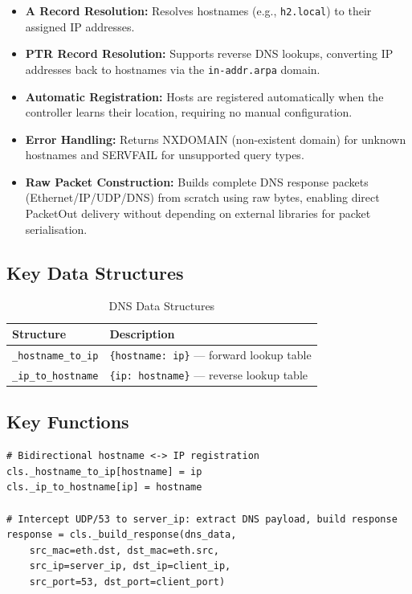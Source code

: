 \documentclass[12pt,a4paper]{article}
\begin{document}
\begin{itemize}[leftmargin=1.5cm]
    \item \textbf{A Record Resolution:} Resolves hostnames (e.g., \texttt{h2.local}) to their assigned IP addresses.
    \item \textbf{PTR Record Resolution:} Supports reverse DNS lookups, converting IP addresses back to hostnames via the \texttt{in-addr.arpa} domain.
    \item \textbf{Automatic Registration:} Hosts are registered automatically when the controller learns their location, requiring no manual configuration.
    \item \textbf{Error Handling:} Returns NXDOMAIN (non-existent domain) for unknown hostnames and SERVFAIL for unsupported query types.
    \item \textbf{Raw Packet Construction:} Builds complete DNS response packets (Ethernet/IP/UDP/DNS) from scratch using raw bytes, enabling direct PacketOut delivery without depending on external libraries for packet serialisation.
\end{itemize}

\subsection{Key Data Structures}

\begin{table}[H]
\centering
\begin{tabular}{@{}lp{8cm}@{}}
\toprule
\textbf{Structure} & \textbf{Description} \\
\midrule
\texttt{\_hostname\_to\_ip} & \texttt{\{hostname: ip\}} --- forward lookup table \\
\texttt{\_ip\_to\_hostname} & \texttt{\{ip: hostname\}} --- reverse lookup table \\
\bottomrule
\end{tabular}
\caption{DNS Data Structures}
\end{table}

\subsection{Key Functions}

\begin{lstlisting}[caption={DNS Registration and Query Routing}]
# Bidirectional hostname <-> IP registration
cls._hostname_to_ip[hostname] = ip
cls._ip_to_hostname[ip] = hostname

# Intercept UDP/53 to server_ip: extract DNS payload, build response
response = cls._build_response(dns_data,
    src_mac=eth.dst, dst_mac=eth.src,
    src_ip=server_ip, dst_ip=client_ip,
    src_port=53, dst_port=client_port)
\end{lstlisting}
\end{document}
